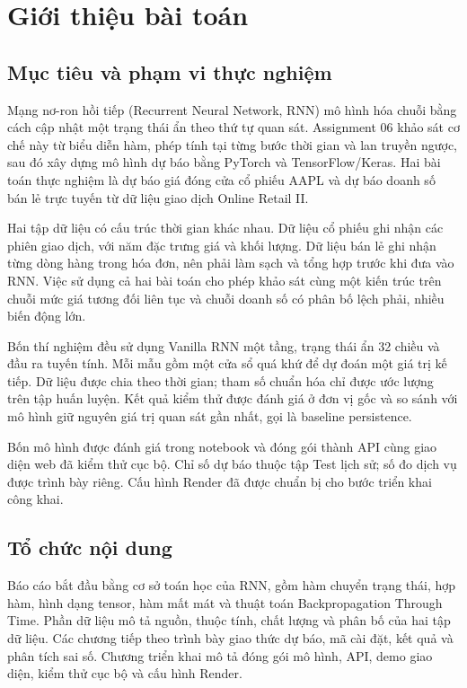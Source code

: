 \documentclass[12pt,a4paper]{report}
\begin{document}
\chapter{Giới thiệu bài toán}
\label{chap:intro}

\section{Mục tiêu và phạm vi thực nghiệm}
Mạng nơ-ron hồi tiếp (Recurrent Neural Network, RNN) mô hình hóa chuỗi bằng cách cập nhật một trạng thái ẩn theo thứ tự quan sát. Assignment 06 khảo sát cơ chế này từ biểu diễn hàm, phép tính tại từng bước thời gian và lan truyền ngược, sau đó xây dựng mô hình dự báo bằng PyTorch và TensorFlow/Keras. Hai bài toán thực nghiệm là dự báo giá đóng cửa cổ phiếu AAPL và dự báo doanh số bán lẻ trực tuyến từ dữ liệu giao dịch Online Retail II.

Hai tập dữ liệu có cấu trúc thời gian khác nhau. Dữ liệu cổ phiếu ghi nhận các phiên giao dịch, với năm đặc trưng giá và khối lượng. Dữ liệu bán lẻ ghi nhận từng dòng hàng trong hóa đơn, nên phải làm sạch và tổng hợp trước khi đưa vào RNN. Việc sử dụng cả hai bài toán cho phép khảo sát cùng một kiến trúc trên chuỗi mức giá tương đối liên tục và chuỗi doanh số có phân bố lệch phải, nhiều biến động lớn.

Bốn thí nghiệm đều sử dụng Vanilla RNN một tầng, trạng thái ẩn 32 chiều và đầu ra tuyến tính. Mỗi mẫu gồm một cửa sổ quá khứ để dự đoán một giá trị kế tiếp. Dữ liệu được chia theo thời gian; tham số chuẩn hóa chỉ được ước lượng trên tập huấn luyện. Kết quả kiểm thử được đánh giá ở đơn vị gốc và so sánh với mô hình giữ nguyên giá trị quan sát gần nhất, gọi là baseline persistence.

Bốn mô hình được đánh giá trong notebook và đóng gói thành API cùng giao diện web đã kiểm thử cục bộ. Chỉ số dự báo thuộc tập Test lịch sử; số đo dịch vụ được trình bày riêng. Cấu hình Render đã được chuẩn bị cho bước triển khai công khai.

\section{Tổ chức nội dung}
Báo cáo bắt đầu bằng cơ sở toán học của RNN, gồm hàm chuyển trạng thái, hợp hàm, hình dạng tensor, hàm mất mát và thuật toán Backpropagation Through Time. Phần dữ liệu mô tả nguồn, thuộc tính, chất lượng và phân bố của hai tập dữ liệu. Các chương tiếp theo trình bày giao thức dự báo, mã cài đặt, kết quả và phân tích sai số. Chương triển khai mô tả đóng gói mô hình, API, demo giao diện, kiểm thử cục bộ và cấu hình Render.
\end{document}
